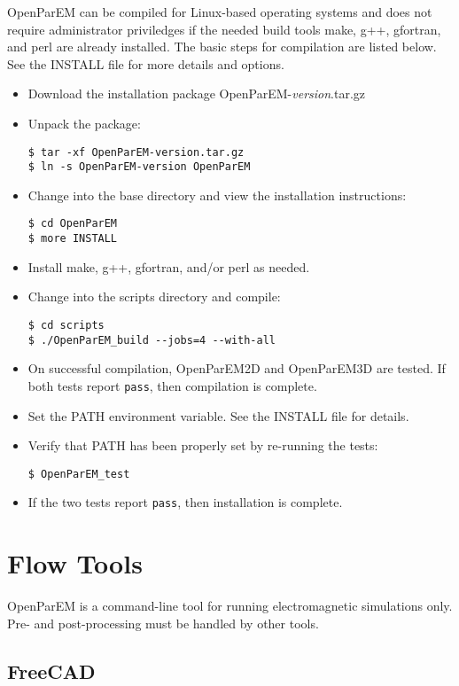\documentclass[titlepage]{article}
\renewcommand\_{\textunderscore\linebreak[1]}
\begin{document}
OpenParEM can be compiled for Linux-based operating systems and does not require administrator priviledges if the needed build tools make, g++, gfortran, and perl are already installed.
The basic steps for compilation are listed below.  See the INSTALL file for more details and options.
\begin{itemize}[nosep]
   \item Download the installation package OpenParEM-\textit{version}.tar.gz
   \item Unpack the package:
         \begin{Verbatim}
$ tar -xf OpenParEM-version.tar.gz
$ ln -s OpenParEM-version OpenParEM
         \end{Verbatim}
   \item Change into the base directory and view the installation instructions:
         \begin{Verbatim}
$ cd OpenParEM
$ more INSTALL
         \end{Verbatim}
   \item Install make, g++, gfortran, and/or perl as needed.
   \item Change into the scripts directory and compile:
         \begin{Verbatim}
$ cd scripts
$ ./OpenParEM_build --jobs=4 --with-all
         \end{Verbatim}
   \item On successful compilation, OpenParEM2D and OpenParEM3D are tested.  If both tests report \texttt{pass}, then compilation is complete.
   \item Set the PATH environment variable.  See the INSTALL file for details.
   \item Verify that PATH has been properly set by re-running the tests:
         \begin{Verbatim}
$ OpenParEM_test
         \end{Verbatim}
   \item If the two tests report \texttt{pass}, then installation is complete.
\end{itemize}

\section{Flow Tools}

OpenParEM is a command-line tool for running electromagnetic simulations only.  Pre- and post-processing must be handled by other tools.

\subsection{FreeCAD}
\label{sec:freecad}
\end{document}

